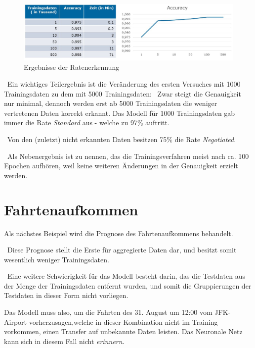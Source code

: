 \begin{figure}[h]
	\begin{center}
		\includegraphics[width=0.95\linewidth]{Bilder/RatenErgebnisse}
		\caption[Ergebnisse der Trinkgeldprognose]{Ergebnisse der Ratenerkennung}
		\label{fig:RateErg}
	\end{center}
\end{figure}

~\newline Ein wichtiges Teilergebnis ist die Veränderung des ersten Versuches mit 1000 Trainingsdaten zu dem mit 5000 Trainingsdaten: 
~\newline Zwar steigt die Genauigkeit nur minimal, dennoch werden erst ab 5000 Trainingsdaten die weniger vertretenen Daten korrekt erkannt. Das Modell für 1000 Trainingsdaten gab immer die Rate \textit{Standard} aus - welche zu 97\% auftritt. 


~\newline Von den (zuletzt) nicht erkannten Daten besitzen 75\% die Rate \textit{Negotiated}.

~\newline Als Nebenergebnis ist zu nennen, das die Trainingsverfahren meist nach ca. 100 Epochen aufhören, weil keine weiteren Änderungen in der Genauigkeit erzielt werden.
\newpage
\section{Fahrtenaufkommen}
\label{sec:RidesPred}
Als nächstes Beispiel wird die Prognose des Fahrtenaufkommens behandelt. 

~\newline Diese Prognose stellt die Erste für aggregierte Daten dar, und besitzt somit wesentlich weniger Trainingsdaten.

~\newline Eine weitere Schwierigkeit für das Modell besteht darin, das die Testdaten aus der Menge der Trainingsdaten entfernt wurden, und somit die Gruppierungen der Testdaten in dieser Form nicht vorliegen. 

Das Modell muss also, um die Fahrten des 31. August um 12:00 vom JFK-Airport vorherzusagen,welche in dieser Kombination nicht im Training vorkommen, einen Transfer auf unbekannte Daten leisten. Das Neuronale Netz kann sich in diesem Fall nicht \textit{erinnern}.

